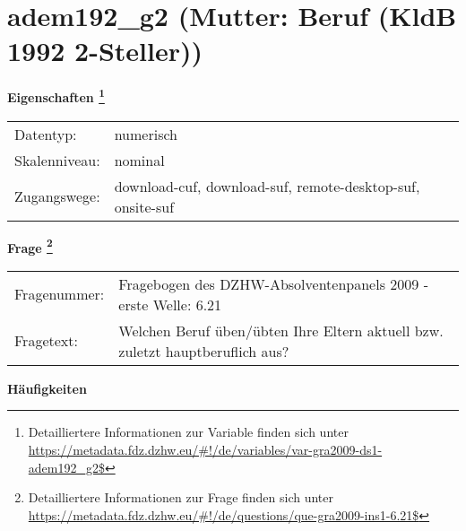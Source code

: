 
    \setcounter{footnote}{0}

    \vspace*{-1.8cm}
	\section{adem192\_g2 (Mutter: Beruf (KldB 1992 2-Steller))}
	\label{section:adem192_g2}



    \vspace*{0.5cm}
    \noindent\textbf{Eigenschaften
	\footnote{Detailliertere Informationen zur Variable finden sich unter
		\url{https://metadata.fdz.dzhw.eu/\#!/de/variables/var-gra2009-ds1-adem192_g2$}}}\\
	\begin{tabularx}{\hsize}{@{}lX}
	Datentyp: & numerisch \\
	Skalenniveau: & nominal \\
	Zugangswege: &
	  download-cuf, 
	  download-suf, 
	  remote-desktop-suf, 
	  onsite-suf
 \\
    \end{tabularx}



				\vspace*{0.5cm}
                \noindent\textbf{Frage
	                \footnote{Detailliertere Informationen zur Frage finden sich unter
		              \url{https://metadata.fdz.dzhw.eu/\#!/de/questions/que-gra2009-ins1-6.21$}}}\\
				\begin{tabularx}{\hsize}{@{}lX}
					Fragenummer: &
					  Fragebogen des DZHW-Absolventenpanels 2009 - erste Welle:
					  6.21
 \\
					Fragetext: & Welchen Beruf üben/übten Ihre Eltern aktuell bzw. zuletzt hauptberuflich aus? \\
				\end{tabularx}





        		\vspace*{0.5cm}
                \noindent\textbf{Häufigkeiten}

